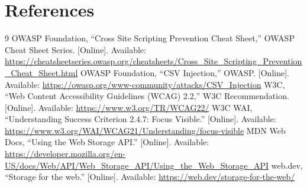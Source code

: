 \documentclass[12pt]{article}
\begin{document}
\section{References}
\begin{thebibliography}{9}
 OWASP Foundation, ``Cross Site Scripting Prevention Cheat Sheet,'' OWASP Cheat Sheet Series. [Online]. Available: \url{https://cheatsheetseries.owasp.org/cheatsheets/Cross_Site_Scripting_Prevention_Cheat_Sheet.html}
 OWASP Foundation, ``CSV Injection,'' OWASP. [Online]. Available: \url{https://owasp.org/www-community/attacks/CSV_Injection}
 W3C, ``Web Content Accessibility Guidelines (WCAG) 2.2,'' W3C Recommendation. [Online]. Available: \url{https://www.w3.org/TR/WCAG22/}
 W3C WAI, ``Understanding Success Criterion 2.4.7: Focus Visible.'' [Online]. Available: \url{https://www.w3.org/WAI/WCAG21/Understanding/focus-visible}
 MDN Web Docs, ``Using the Web Storage API.'' [Online]. Available: \url{https://developer.mozilla.org/en-US/docs/Web/API/Web_Storage_API/Using_the_Web_Storage_API}
 web.dev, ``Storage for the web.'' [Online]. Available: \url{https://web.dev/storage-for-the-web/}
\end{thebibliography}
\end{document}
